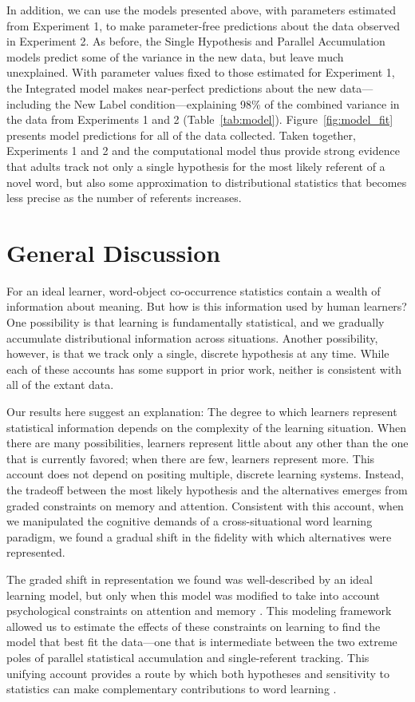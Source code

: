 \documentclass[man,floatsintext]{apa6}
\begin{document}
In addition, we can use the models presented above, with parameters estimated from Experiment 1, to make parameter-free predictions about the data observed in Experiment 2. As before, the Single Hypothesis and Parallel Accumulation models predict some of the variance in the new data, but leave much unexplained. With parameter values fixed to those estimated for Experiment 1, the Integrated model makes near-perfect predictions about the new data---including the New Label condition---explaining 98\% of the combined variance in the data from Experiments 1 and 2 (Table~\ref{tab:model}). Figure~\ref{fig:model_fit} presents model predictions for all of the data collected. Taken together, Experiments 1 and 2 and the computational model thus provide strong evidence that adults track not only a single hypothesis for the most likely referent of a novel word, but also some approximation to distributional statistics that becomes less precise as the number of referents increases.

\section{General Discussion}

For an ideal learner, word-object co-occurrence statistics contain a wealth of information about meaning. But how is this information used by human learners? One possibility is that learning is fundamentally statistical, and we gradually accumulate distributional information across situations. Another possibility, however, is that we track only a single, discrete hypothesis at any time. While each of these accounts has some support in prior work, neither is consistent with all of the extant data.

Our results here suggest an explanation: The degree to which learners represent statistical information depends on the complexity of the learning situation. When there are many possibilities, learners represent little about any other than the one that is currently favored; when there are few, learners represent more. This account does not depend on positing multiple, discrete learning systems. Instead, the tradeoff between the most likely hypothesis and the alternatives emerges from graded constraints on memory and attention. Consistent with this account, when we manipulated the cognitive demands of a cross-situational word learning paradigm, we found a gradual shift in the fidelity with which alternatives were represented.

The graded shift in representation we found was well-described by an ideal learning model, but only when this model was modified to take into account psychological constraints on attention and memory \cite{Kachergis2012,Smith2013,Vlach2013,Yurovsky2014}. This modeling framework allowed us to estimate the effects of these constraints on learning to find the model that best fit the data---one that is intermediate between the two extreme poles of parallel statistical accumulation and single-referent tracking. This unifying account provides a route by which both hypotheses and sensitivity to statistics can make complementary contributions to word learning \cite{Waxman2009,Kachergis2013}. 
\end{document}
